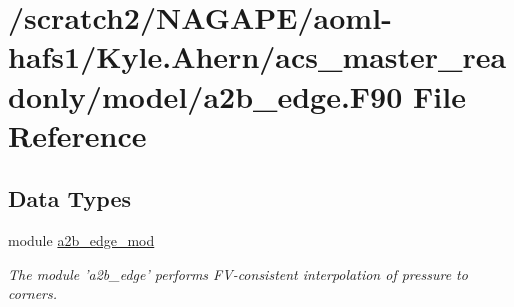 \section{/scratch2/\-N\-A\-G\-A\-P\-E/aoml-\/hafs1/\-Kyle.Ahern/acs\-\_\-master\-\_\-readonly/model/a2b\-\_\-edge.F90 File Reference}
\label{a2b__edge_8F90}
\subsection*{Data Types}
\begin{DoxyCompactItemize}
\item 
module \hyperlink{classa2b__edge__mod}{a2b\-\_\-edge\-\_\-mod}
\begin{DoxyCompactList}\small\item\em The module 'a2b\-\_\-edge' performs F\-V-\/consistent interpolation of pressure to corners. \end{DoxyCompactList}\end{DoxyCompactItemize}

